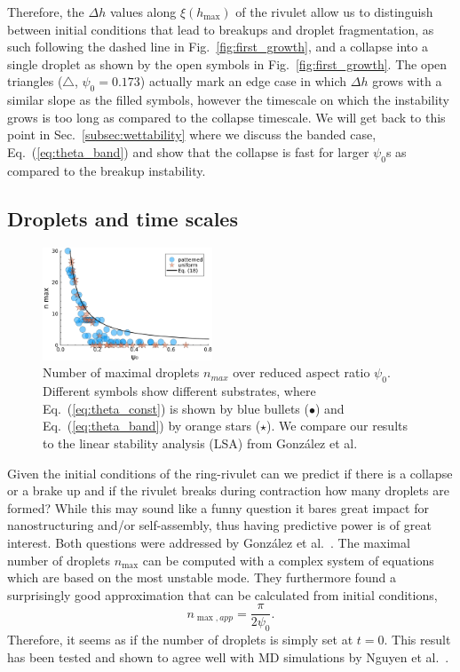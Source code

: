 \documentclass[twoside,twocolumn,9pt]{article}
\begin{document}
Therefore, the $\Delta h$ values along $\xi(h_{\max})$ of the rivulet allow us to distinguish between initial conditions that lead to breakups and droplet fragmentation, as such following the dashed line in Fig.~\ref{fig:first_growth}, and a collapse into a single droplet as shown by the open symbols in Fig.~\ref{fig:first_growth}.
The open triangles ($\triangle$, $\psi_0 = 0.173$) actually mark an edge case in which $\Delta h$ grows with a similar slope as the filled symbols, however the timescale on which the instability grows is too long as compared to the collapse timescale. 
We will get back to this point in Sec.~\ref{subsec:wettability} where we discuss the banded case, Eq.~(\ref{eq:theta_band}) and show that the collapse is fast for larger $\psi_0$s as compared to the breakup instability.

\subsection{Droplets and time scales}\label{subsec:drop-counting}
\begin{figure}
    \centering
    \includegraphics[width=0.45\textwidth]{assets/LSA_droplets.pdf}
    \caption{Number of maximal droplets $n_{max}$ over reduced aspect ratio $\psi_0$.
    Different symbols show different substrates, where Eq.~(\ref{eq:theta_const}) is shown by blue bullets (\textcolor{jlblue}{$\bullet$}) and Eq.~(\ref{eq:theta_band}) by orange stars (\textcolor{jlorange}{$\star$}).
    We compare our results to the linear stability analysis (LSA) from Gonz{\'a}lez et al.~\cite{gonzalezStabilityLiquidRing2013}}
    \label{fig:max_drops}
\end{figure}

Given the initial conditions of the ring-rivulet can we predict if there is a collapse or a brake up and if the rivulet breaks during contraction how many droplets are formed?
While this may sound like a funny question it bares great impact for nanostructuring and/or self-assembly, thus having predictive power is of great interest.
Both questions were addressed by Gonz{\'a}lez et al.~\cite{gonzalezStabilityLiquidRing2013}. 
The maximal number of droplets $n_{\max}$ can be computed with a complex system of equations which are based on the most unstable mode.
They furthermore found a surprisingly good approximation that can be calculated from initial conditions, 
\begin{equation}\label{eq:maxDrops}
    n_{\max, app} = \frac{\pi}{2\psi_0}.
\end{equation}
Therefore, it seems as if the number of droplets is simply set at $t=0$.
This result has been tested and shown to agree well with MD simulations by Nguyen et al.~\cite{nguyenCompetitionCollapseBreakup2012}. 
\end{document}
